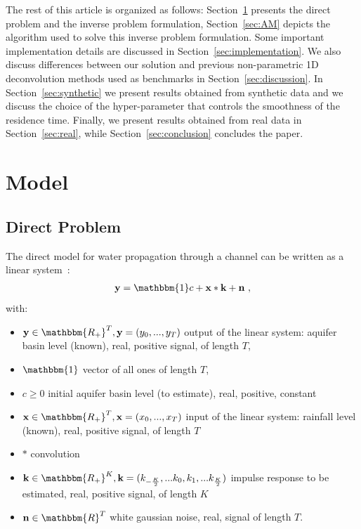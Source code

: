 \documentclass[]{elsarticle} %
\begin{document}
The rest of this article is organized as follows: Section~\ref{sec:model} presents the direct problem and the inverse problem formulation, Section~\ref{sec:AM} depicts the algorithm used to solve this inverse problem formulation. Some important implementation details are discussed in Section~\ref{sec:implementation}. We also discuss differences between our solution and previous non-parametric 1D deconvolution methods used as benchmarks in Section~\ref{sec:discussion}. In Section~\ref{sec:synthetic} we present results obtained from synthetic data and we discuss the choice of the hyper-parameter that controls the smoothness of the residence time. Finally, we present results obtained from real data in Section~\ref{sec:real}, while Section~\ref{sec:conclusion} concludes the paper.

\section{Model}
\label{sec:model}

\subsection{Direct Problem}

The direct model for water propagation through a channel can be written as a linear system~\cite{Z_Hydro_Neuman1982}:
\begin{equation}\label{1}
\begin{aligned}
\textbf{y} = \mathbbm{1}c + \textbf{x} \ast \textbf{k} + \textbf{n}\ ,
\end{aligned}
\end{equation}
with:
\begin{itemize}
    \item $\textbf{y} \in \mathbbm{R_+}^{T}, \textbf{y} = (y_{0}, ... , y_{T})$ output of the linear system: aquifer basin level (known), real, positive signal, of length $T$,
    \item $\mathbbm{1}$ vector of all ones of length $T$,
    \item $c\geq 0$ initial aquifer basin level (to estimate), real, positive, constant
    \item $\textbf{x} \in \mathbbm{R_+}^{T}, \textbf{x} = (x_{0}, ... , x_{T})$  input of the linear system: rainfall level (known), real, positive signal, of length $T$
    \item $\ast$ convolution
    \item $\textbf{k} \in \mathbbm{R_+}^{K}, \textbf{k} = (k_{-\frac{K}{2}}, ... k_{0}, k_{1}, ... k_{\frac{K}{2}})$  impulse response to be estimated, real, positive signal, of length $K$
    \item $\textbf{n}\in\mathbbm{R}^T$  white gaussian noise, real, signal of length $T$.
\end{itemize}
\end{document}

